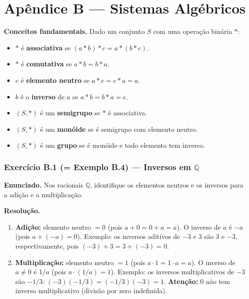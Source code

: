 \documentclass[12pt,a4paper]{article}
\newcommand{\keyword}[1]{\textbf{\textcolor{azul}{#1}}}
\begin{document}
\newpage
\part*{Apêndice B — Sistemas Algébricos}

\begin{teoriacaixa}
\textbf{Conceitos fundamentais.}
Dado um conjunto $S$ com uma operação binária $*$:
\begin{itemize}[noitemsep]
  \item $*$ é \keyword{associativa} se $(a * b) * c = a * (b * c)$.
  \item $*$ é \keyword{comutativa} se $a * b = b * a$.
  \item $e$ é \keyword{elemento neutro} se $a * e = e * a = a$.
  \item $b$ é o \keyword{inverso} de $a$ se $a * b = b * a = e$.
  \item $(S, *)$ é um \keyword{semigrupo} se $*$ é associativa.
  \item $(S, *)$ é um \keyword{monóide} se é semigrupo com elemento neutro.
  \item $(S, *)$ é um \keyword{grupo} se é monóide e todo elemento tem inverso.
\end{itemize}
\end{teoriacaixa}

\section*{Exercício B.1 (= Exemplo B.4) — Inversos em $\mathbb{Q}$}

\textbf{Enunciado.} Nos racionais $\mathbb{Q}$, identifique os elementos neutros e os
inversos para a adição e a multiplicação.

\medskip
\textbf{Resolução.}

\begin{enumerate}[label=(\alph*)]
  \item \textbf{Adição:} elemento neutro $= 0$ (pois $a + 0 = 0 + a = a$).
        O inverso de $a$ é $-a$ (pois $a + (-a) = 0$).
        Exemplo: os inversos aditivos de $-3$ e $3$ são $3$ e $-3$, respectivamente,
        pois $(-3) + 3 = 3 + (-3) = 0$.

  \item \textbf{Multiplicação:} elemento neutro $= 1$ (pois $a \cdot 1 = 1 \cdot a = a$).
        O inverso de $a \ne 0$ é $1/a$ (pois $a \cdot (1/a) = 1$).
        Exemplo: os inversos multiplicativos de $-3$ são $-1/3$:
        $(-3)(-1/3) = (-1/3)(-3) = 1$.
        \textbf{Atenção:} $0$ não tem inverso multiplicativo (divisão por zero indefinida).
\end{enumerate}
\end{document}
